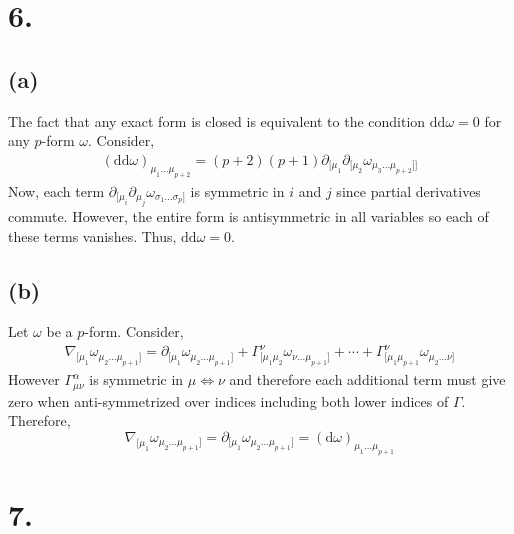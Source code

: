 \documentclass[12pt]{article}
\begin{document}
\section*{6.}

\renewcommand{\d}[1]{\mathrm{d} #1}

\subsection*{(a)}

The fact that any exact form is closed is equivalent to the condition $\d{\d{\omega}} = 0$ for any $p$-form $\omega$. Consider,
\begin{align*}
(\d{\d{\omega}})_{\mu_1 \dots \mu_{p+2}} = (p + 2)(p + 1) \partial_{[\mu_1 } \partial_{[\mu_2} \omega_{\mu_3 \dots \mu_{p + 2}]]} 
\end{align*}
Now, each term $\partial_{[\mu_i} \partial_{\mu_j} \omega_{\sigma_1 \dots \sigma_p]}$ is symmetric in $i$ and $j$ since partial derivatives commute. However, the entire form is antisymmetric in all variables so each of these terms vanishes. Thus, $\d{\d{\omega}} = 0$. 

\subsection*{(b)}

Let $\omega$ be a $p$-form. Consider,
\begin{align*}
\nabla_{[\mu_1} \omega_{\mu_2 \dots \mu_{p+1}]} = \partial_{[ \mu_1} \omega_{\mu_2 \dots \mu_{p+1}]} + \Gamma^\nu_{[\mu_1 \mu_2} \omega_{\nu \dots \mu_{p+1}]} + \cdots + \Gamma^{\nu}_{[\mu_1 \mu_{p+1}} \omega_{\mu_2 \dots \nu]}
\end{align*}
However $\Gamma^{\alpha}_{\mu \nu}$ is symmetric in $\mu \iff \nu$ and therefore each additional term must give zero when anti-symmetrized over indices including both lower indices of $\Gamma$. Therefore,
\[ \nabla_{[\mu_1} \omega_{\mu_2 \dots \mu_{p+1}]} = \partial_{[ \mu_1} \omega_{\mu_2 \dots \mu_{p+1}]} = (\d{\omega})_{\mu_1 \dots \mu_{p + 1}} \]

\section*{7.}
\end{document}
